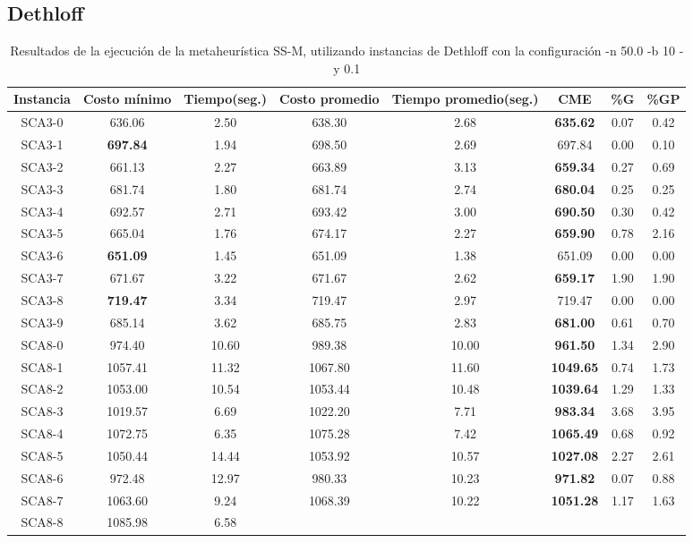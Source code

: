 \subsection{Dethloff}
\begin{table}[h]
\caption{Resultados de la ejecución de la metaheurística SS-M, utilizando instancias de Dethloff con la configuración -n 50.0 -b 10 -y 0.1}
\centering
\small
\begin{tabular}{c c c c c c c c}
\hline\hline
Instancia & Costo mínimo & Tiempo(seg.) & Costo promedio & Tiempo promedio(seg.) & CME & \%G & \%GP \\ [0.5ex]
\hline
SCA3-0 & 636.06 & 2.50 & 
638.30 & 2.68 & \bf{635.62} & 
0.07 & 0.42\\SCA3-1 & \bf{697.84} & 1.94 & 
698.50 & 2.69 & 697.84 & 0.00
 & 0.10\\SCA3-2 & 661.13 & 2.27 & 
663.89 & 3.13 & \bf{659.34} & 
0.27 & 0.69\\SCA3-3 & 681.74 & 1.80 & 
681.74 & 2.74 & \bf{680.04} & 
0.25 & 0.25\\SCA3-4 & 692.57 & 2.71 & 
693.42 & 3.00 & \bf{690.50} & 
0.30 & 0.42\\SCA3-5 & 665.04 & 1.76 & 
674.17 & 2.27 & \bf{659.90} & 
0.78 & 2.16\\SCA3-6 & \bf{651.09} & 1.45 & 
651.09 & 1.38 & 651.09 & 0.00
 & 0.00\\
SCA3-7 & 671.67 & 3.22 & 
671.67 & 2.62 & \bf{659.17} & 
1.90 & 1.90\\SCA3-8 & \bf{719.47} & 3.34 & 
719.47 & 2.97 & 719.47 & 0.00
 & 0.00\\
SCA3-9 & 685.14 & 3.62 & 
685.75 & 2.83 & \bf{681.00} & 
0.61 & 0.70\\SCA8-0 & 974.40 & 10.60 & 
989.38 & 10.00 & \bf{961.50} & 
1.34 & 2.90\\SCA8-1 & 1057.41 & 11.32 & 
1067.80 & 11.60 & \bf{1049.65} & 
0.74 & 1.73\\SCA8-2 & 1053.00 & 10.54 & 
1053.44 & 10.48 & \bf{1039.64} & 
1.29 & 1.33\\SCA8-3 & 1019.57 & 6.69 & 
1022.20 & 7.71 & \bf{983.34} & 
3.68 & 3.95\\SCA8-4 & 1072.75 & 6.35 & 
1075.28 & 7.42 & \bf{1065.49} & 
0.68 & 0.92\\SCA8-5 & 1050.44 & 14.44 & 
1053.92 & 10.57 & \bf{1027.08} & 
2.27 & 2.61\\SCA8-6 & 972.48 & 12.97 & 
980.33 & 10.23 & \bf{971.82} & 
0.07 & 0.88\\SCA8-7 & 1063.60 & 9.24 & 
1068.39 & 10.22 & \bf{1051.28} & 
1.17 & 1.63\\SCA8-8 & 1085.98 & 6.58 & 

\end{tabular}
\end{table}

